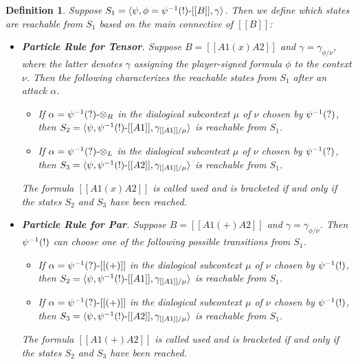 \documentclass{article}
\newtheorem{definition}[theorem]{Definition}
\begin{document}
\begin{definition}
  \label{def:particle-rules}
  Suppose $S_1 = \langle \psi, \phi = \psi^{-1}(!)\text{-}[[B]],\gamma \rangle$.
  Then we define which states are reachable from $S_1$ based on the
  main connective of $[[B]]$:
  \begin{center}
    \begin{itemize}
    \item[] \textbf{Particle Rule for Tensor}. Suppose
      $B = [[A1 (x) A2]]$ and $\gamma = \gamma_{\phi/\nu}$, where the
      latter denotes $\gamma$ assigning the player-signed formula
      $\phi$ to the context $\nu$.  Then the following characterizes
      the reachable states from $S_1$ after an attack $\alpha$.
      \begin{center}
        \begin{itemize}
        \item If $\alpha =  \psi^{-1}(?)\text{-}\otimes_R$ in the
          dialogical subcontext $\mu$ of $\nu$ chosen by $\psi^{-1}(?)$, then
          $S_2 = \langle \psi, \psi^{-1}(!)\text{-}[[A1]],\gamma_{[[A1]]/\mu} \rangle$ is
          reachable from $S_1$. \\
        \item If $\alpha =  \psi^{-1}(?)\text{-}\otimes_L$ in the
          dialogical subcontext $\mu$ of $\nu$ chosen by $\psi^{-1}(?)$, then
          $S_3 = \langle \psi, \psi^{-1}(!)\text{-}[[A2]],\gamma_{[[A1]]/\mu} \rangle$ is
          reachable from $S_1$.\\
        \end{itemize}                
      \end{center}
      The formula $[[A1 (x) A2]]$ is called used and is bracketed if
      and only if the states $S_2$ and $S_3$ have been reached.
      
    \item[] \textbf{Particle Rule for Par}. Suppose
      $B = [[A1 (+) A2]]$ and $\gamma = \gamma_{\phi/\nu}$. Then
      $\psi^{-1}(!)$ can choose one of the following possible transitions
      from $S_1$.
      \begin{center}
        \begin{itemize}
        \item If $\alpha =  \psi^{-1}(?)\text{-}[[(+)]]$ in the
          dialogical subcontext $\mu$ of $\nu$ chosen by $\psi^{-1}(!)$, then
          $S_2 = \langle \psi, \psi^{-1}(!)\text{-}[[A1]],\gamma_{[[A1]]/\mu} \rangle$ is
          reachable from $S_1$. \\
        \item If $\alpha = \psi^{-1}(?)\text{-}[[(+)]]$ in the dialogical
          subcontext $\mu$ of $\nu$ chosen by $\psi^{-1}(!)$, then
          $S_3 = \langle \psi,
          \psi^{-1}(!)\text{-}[[A2]],\gamma_{[[A1]]/\mu} \rangle$ is
          reachable from $S_1$.\\
        \end{itemize}                
      \end{center}
      The formula $[[A1 (+) A2]]$ is called used and is bracketed if
      and only if the states $S_2$ and $S_3$ have been reached.


\end{itemize}
\end{center}
\end{definition}
\end{document}
